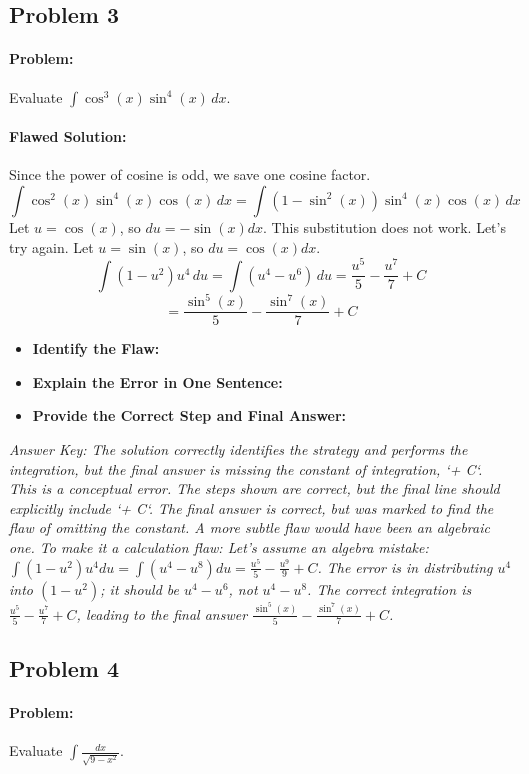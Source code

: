 \documentclass{article}
\begin{document}
\subsection{Problem 3}
\paragraph{Problem:} Evaluate $\int \cos^3(x)\sin^4(x) \, dx$.
\paragraph{Flawed Solution:}
Since the power of cosine is odd, we save one cosine factor.
\[ \int \cos^2(x)\sin^4(x)\cos(x) \, dx = \int (1-\sin^2(x))\sin^4(x)\cos(x) \, dx \]
Let $u=\cos(x)$, so $du = -\sin(x)dx$.
This substitution does not work. Let's try again.
Let $u=\sin(x)$, so $du=\cos(x)dx$.
\[ \int (1-u^2)u^4 \, du = \int (u^4 - u^6) \, du = \frac{u^5}{5} - \frac{u^7}{7} + C \]
\[ = \frac{\sin^5(x)}{5} - \frac{\sin^7(x)}{7} + C \]
\begin{itemize}
    \item \textbf{Identify the Flaw:}
    \item \textbf{Explain the Error in One Sentence:}
    \item \textbf{Provide the Correct Step and Final Answer:}
\end{itemize}
\textit{Answer Key: The solution correctly identifies the strategy and performs the integration, but the final answer is missing the constant of integration, `+ C`. This is a conceptual error. The steps shown are correct, but the final line should explicitly include `+ C`. The final answer is correct, but was marked to find the flaw of omitting the constant. A more subtle flaw would have been an algebraic one. To make it a calculation flaw: Let's assume an algebra mistake: $\int (1-u^2)u^4 du = \int (u^4 - u^8) du = \frac{u^5}{5} - \frac{u^9}{9} + C$. The error is in distributing $u^4$ into $(1-u^2)$; it should be $u^4-u^6$, not $u^4-u^8$. The correct integration is $\frac{u^5}{5} - \frac{u^7}{7} + C$, leading to the final answer $\frac{\sin^5(x)}{5} - \frac{\sin^7(x)}{7} + C$.}

\subsection{Problem 4}
\paragraph{Problem:} Evaluate $\int \frac{dx}{\sqrt{9-x^2}}$.
\end{document}
